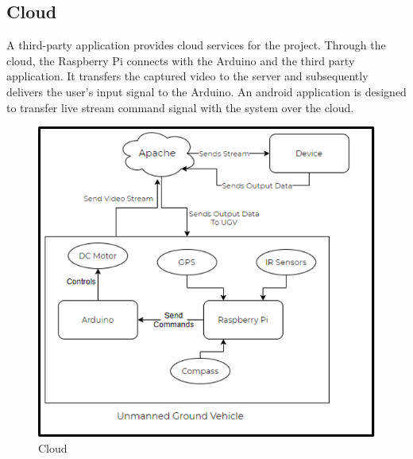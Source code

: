 \documentclass[conference,a4paper]{IEEEtran}
\begin{document}
\subsection{Cloud}
A third-party application provides cloud services for the project. Through the cloud, the Raspberry Pi connects with the Arduino and the third party application. It transfers the captured video to the server and subsequently delivers the user's input signal to the Arduino. An android application is designed to transfer live stream command signal with the system over the cloud. \cite{7}
\begin{figure}[ht]
\centering
\includegraphics[width=1\linewidth]{IoT.jpg}
\caption{Cloud}
\label{Fig: IoT2}
\end{figure}
\end{document}
